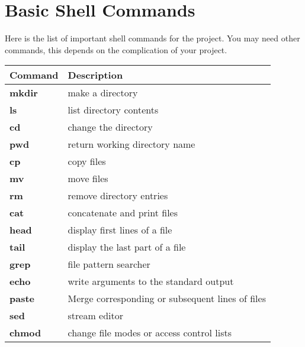 \section{Basic Shell Commands}

Here is the list of important shell commands for the project. You may need other commands, this depends on the complication of your project. \\


\begin{table}[h]

\begin{tabular}{ m{2cm}  m{12cm} }

\hline
 \textbf{Command}          &  \textbf{Description}\\ 
\hline
 \textbf{mkdir}          & make a directory \\ 
 \textbf{ls}                & list directory contents \\ 
 \textbf{cd}               & change the directory\\
 \textbf{pwd}            & return working directory name \\
 \textbf{cp}               & copy files \\ 
 \textbf{mv}              & move files \\ 
 \textbf{rm}               & remove directory entries \\ 
 \textbf{cat}              & concatenate and print files \\    
 \textbf{head}           & display first lines of a file\\
 \textbf{tail}              & display the last part of a file\\
 \textbf{grep}            & file pattern searcher\\   
 \textbf{echo}           & write arguments to the standard output\\
 \textbf{paste}          & Merge corresponding or subsequent lines of files\\
 \textbf{sed}             & stream editor\\   
 \textbf{chmod}        & change file modes or access control lists\\ 
 \hline
 \end{tabular}
\label{tab:b_k_m_param}
\end{table}

